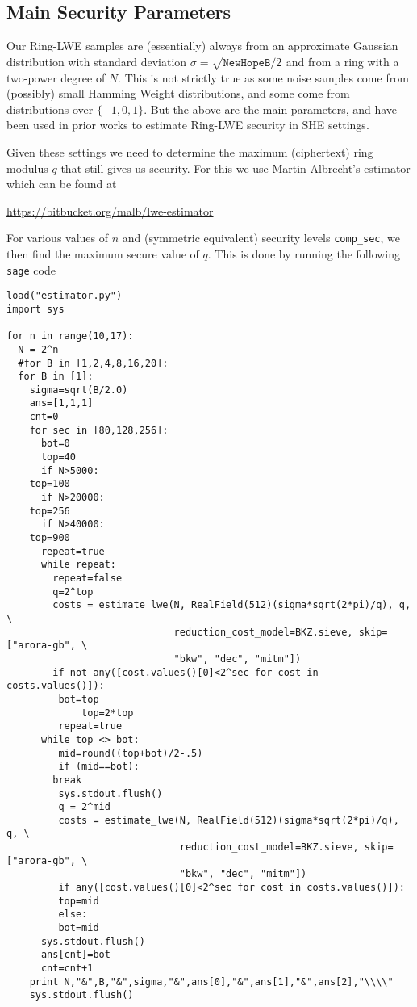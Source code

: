 \subsection{Main Security Parameters}
Our Ring-LWE samples are (essentially) always from an
approximate Gaussian distribution with standard deviation 
$\sigma=\sqrt{\texttt{NewHopeB}/2}$
and from a ring with a two-power degree of $N$.
This is not strictly true as some noise samples come
from (possibly) small Hamming Weight distributions, and some come
from distributions over $\{-1,0,1\}$. 
But the above are the main parameters, and have been used in prior works to
estimate Ring-LWE security in SHE settings.

Given these settings we need to determine the maximum 
(ciphertext) ring modulus $q$ that still gives us security.
For this we use Martin Albrecht's estimator which can
be found at
\begin{center}
\url{https://bitbucket.org/malb/lwe-estimator}
\end{center}
For various values of $n$ and (symmetric equivalent)
security levels \verb+comp_sec+, we then find the maximum secure
value of $q$.
This is done by running the following \verb+sage+ code
\begin{verbatim}
load("estimator.py")
import sys

for n in range(10,17):
  N = 2^n
  #for B in [1,2,4,8,16,20]:
  for B in [1]:
    sigma=sqrt(B/2.0)
    ans=[1,1,1]
    cnt=0
    for sec in [80,128,256]:
      bot=0
      top=40
      if N>5000:
	top=100
      if N>20000:
	top=256
      if N>40000:
	top=900
      repeat=true
      while repeat:
        repeat=false
        q=2^top
        costs = estimate_lwe(N, RealField(512)(sigma*sqrt(2*pi)/q), q, \
                             reduction_cost_model=BKZ.sieve, skip=["arora-gb", \
                             "bkw", "dec", "mitm"])
        if not any([cost.values()[0]<2^sec for cost in costs.values()]):
	     bot=top
             top=2*top
	     repeat=true
      while top <> bot:
         mid=round((top+bot)/2-.5)
         if (mid==bot):
		break
         sys.stdout.flush()
         q = 2^mid
         costs = estimate_lwe(N, RealField(512)(sigma*sqrt(2*pi)/q), q, \
                              reduction_cost_model=BKZ.sieve, skip=["arora-gb", \
                              "bkw", "dec", "mitm"])
         if any([cost.values()[0]<2^sec for cost in costs.values()]):
	     top=mid
         else:
	     bot=mid
      sys.stdout.flush()
      ans[cnt]=bot
      cnt=cnt+1
    print N,"&",B,"&",sigma,"&",ans[0],"&",ans[1],"&",ans[2],"\\\\"
    sys.stdout.flush()
\end{verbatim}
